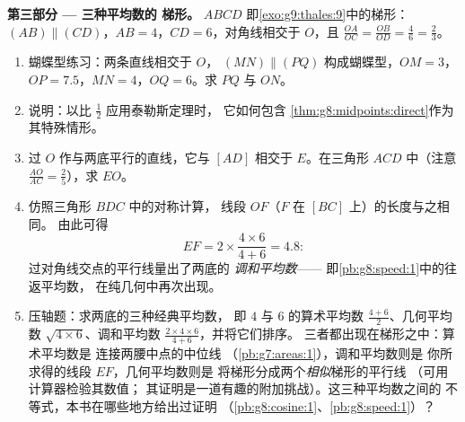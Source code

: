 \begin{problem}
\medskip
\noindent\textbf{第三部分 --- 三种平均数的
梯形。}
$ABCD$ 即\cref{exo:g9:thales:9}中的梯形：
$(AB) \parallel (CD)$，$AB = 4$，$CD = 6$，对角线相交于
$O$，且 $\frac{OA}{OC} = \frac{OB}{OD} = \frac{4}{6} =
\frac23$。
\begin{enumerate}[resume]
  \item 蝴蝶型练习：两条直线相交于 $O$，
        $(MN) \parallel (PQ)$ 构成蝴蝶型，$OM = 3$，
        $OP = 7.5$，$MN = 4$，$OQ = 6$。求 $PQ$ 与
        $ON$。
  \item 说明：以比 $\frac12$ 应用泰勒斯定理时，
        它如何包含
        \cref{thm:g8:midpoints:direct}作为其特殊情形。
  \item 过 $O$ 作与两底平行的直线，它与
        $[AD]$ 相交于 $E$。在三角形 $ACD$ 中（注意
        $\frac{AO}{AC} = \frac25$），求 $EO$。
  \item 仿照三角形 $BDC$ 中的对称计算，
        线段 $OF$（$F$ 在 $[BC]$ 上）的长度与之相同。
        由此可得
        \[
        EF = 2 \times \frac{4 \times 6}{4 + 6} = 4.8 :
        \]
        过对角线交点的平行线量出了两底的
        \emph{调和平均数}——
        即\cref{pb:g8:speed:1}中的往返平均数，
        在纯几何中再次出现。
  \item 压轴题：求两底的三种经典平均数，
        即 $4$ 与 $6$ 的算术平均数
        $\frac{4+6}{2}$、几何平均数 $\sqrt{4 \times 6}$、调和平均数
        $\frac{2 \times 4 \times 6}{4 + 6}$，并将它们排序。
        三者都出现在梯形之中：算术平均数是
        连接两腰中点的中位线
        （\cref{pb:g7:areas:1}），调和平均数则是
        你所求得的线段 $EF$，几何平均数则是
        将梯形分成两个\emph{相似}梯形的平行线
        （可用计算器检验其数值；
        其证明是一道有趣的附加挑战）。这三种平均数之间的
        不等式，本书在哪些地方给出过证明
        （\cref{pb:g8:cosine:1}、\cref{pb:g8:speed:1}）？
\end{enumerate}
\end{problem}
